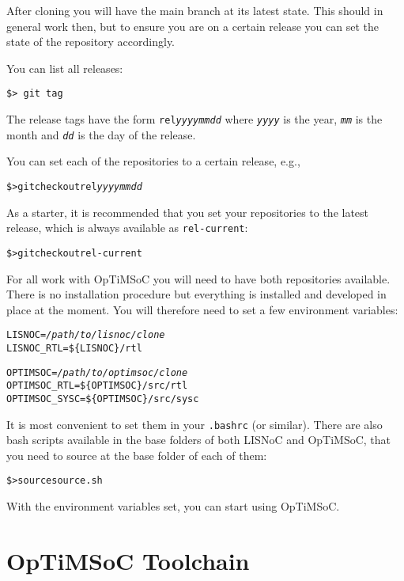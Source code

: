 After cloning you will have the main branch at its latest state. This
should in general work then, but to ensure you are on a certain
release you can set the state of the repository accordingly.

You can list all releases:

\begin{verbatim}
$> git tag
\end{verbatim}

The release tags have the form \texttt{rel\emph{yyyymmdd}} where
\texttt{\emph{yyyy}} is the year, \texttt{\emph{mm}} is the month and
\texttt{\emph{dd}} is the day of the release.

You can set each of the repositories to a certain release, e.g.,

\begin{alltt}
\$> git checkout rel\emph{yyyymmdd}
\end{alltt}

As a starter, it is recommended that you set your repositories to the
latest release, which is always available as \texttt{rel-current}:

\begin{alltt}
\$> git checkout rel-current
\end{alltt}

For all work with OpTiMSoC you will need to have both repositories
available. There is no installation procedure but everything is
installed and developed in place at the moment. You will therefore
need to set a few environment variables:

\begin{alltt}
LISNOC = \emph{/path/to/lisnoc/clone}
LISNOC_RTL = \$\{LISNOC\}/rtl

OPTIMSOC = \emph{/path/to/optimsoc/clone}
OPTIMSOC_RTL = \$\{OPTIMSOC\}/src/rtl
OPTIMSOC_SYSC = \$\{OPTIMSOC\}/src/sysc
\end{alltt}

It is most convenient to set them in your \verb|.bashrc| (or similar).
There are also bash scripts available in the base folders of both
LISNoC and OpTiMSoC, that you need to source at the base folder of
each of them:

\begin{alltt}
\$> source source.sh
\end{alltt}

With the environment variables set, you can start using OpTiMSoC.

\section{OpTiMSoC Toolchain}

